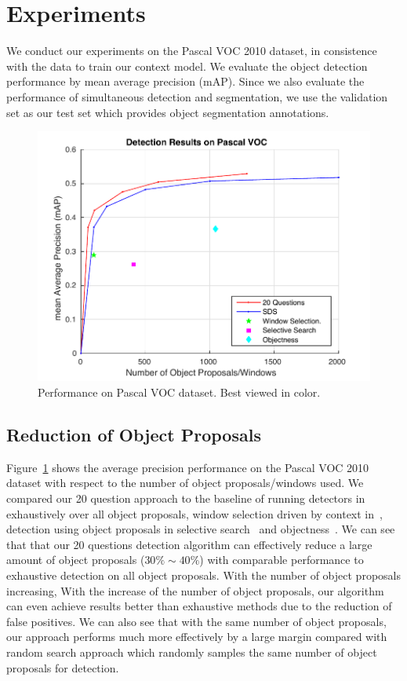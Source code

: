 \section{Experiments}

We conduct our experiments on the Pascal VOC 2010 dataset, in consistence with the data to train our context model. We evaluate the object detection performance by mean average precision (mAP). Since we also evaluate the performance of simultaneous detection and segmentation, we use the validation set as our test set which provides object segmentation annotations. 


\begin{figure}[htb!]
\begin{center}
\includegraphics[width=0.6\linewidth]{figures/numprop.pdf}
\end{center}
\caption{Performance on Pascal VOC dataset. Best viewed in color. }
\label{fig:mapVSnumprop}
\end{figure}

\subsection{Reduction of Object Proposals} 
Figure~\ref{fig:mapVSnumprop} shows the average precision performance on the Pascal VOC 2010 dataset with respect to the number of object proposals/windows used. We compared our 20 question approach to the baseline of running detectors in~\cite{BharathECCV2014} exhaustively over all object proposals,  window selection driven by context in~\cite{bogdan2012context}, detection using object proposals in selective search~\cite{van2011segmentation} and objectness~\cite{alexe2010object}. We can see that that our 20 questions detection algorithm can effectively reduce a large amount of object proposals ($30\% \sim 40\%$) with comparable performance to exhaustive detection on all object proposals. With the number of object proposals increasing, With the increase of the number of object proposals, our algorithm can even achieve results better than exhaustive methods due to the reduction of false positives. We can also see that with the same number of object proposals, our approach performs much more effectively by a large margin compared with random search approach which randomly samples the same number of object proposals for detection. 

